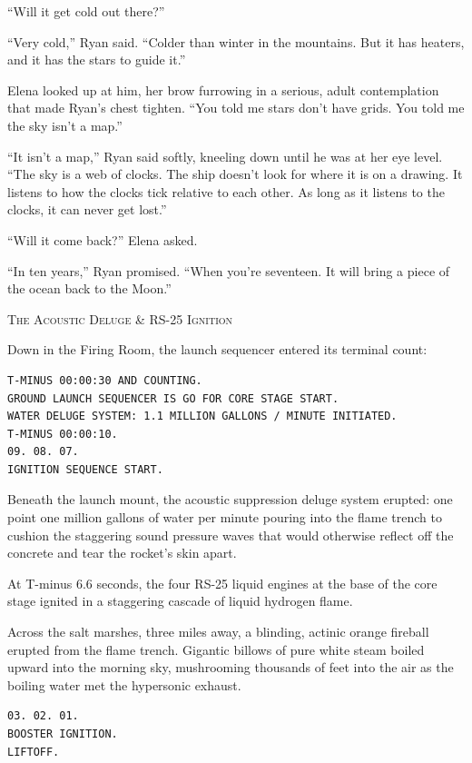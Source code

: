 \documentclass[12pt,twoside,openright]{book}
\newcommand{\sceneheader}[1]{%
  \par\vspace{1.8em}%
  {\noindent\centering\scshape\large #1\par}%
  \vspace{1.0em}%
  \noindent%
}
\newcommand{\dinkus}{%
  \par\vspace{1.2em}%
  {\noindent\centering{\large $\ast\quad\ast\quad\ast$}\par}%
  \vspace{1.2em}%
  \noindent%
}
\begin{document}
``Will it get cold out there?''

``Very cold,'' Ryan said. ``Colder than winter in the mountains. But it
has heaters, and it has the stars to guide it.''

Elena looked up at him, her brow furrowing in a serious, adult
contemplation that made Ryan's chest tighten. ``You told me stars don't
have grids. You told me the sky isn't a map.''

``It isn't a map,'' Ryan said softly, kneeling down until he was at her
eye level. ``The sky is a web of clocks. The ship doesn't look for where
it is on a drawing. It listens to how the clocks tick relative to each
other. As long as it listens to the clocks, it can never get lost.''

``Will it come back?'' Elena asked.

``In ten years,'' Ryan promised. ``When you're seventeen. It will bring
a piece of the ocean back to the Moon.''

\dinkus

\sceneheader{The Acoustic Deluge \& RS-25
Ignition}

Down in the Firing Room, the launch sequencer entered its terminal
count:

\begin{lstlisting}
T-MINUS 00:00:30 AND COUNTING.
GROUND LAUNCH SEQUENCER IS GO FOR CORE STAGE START.
WATER DELUGE SYSTEM: 1.1 MILLION GALLONS / MINUTE INITIATED.
T-MINUS 00:00:10.
09. 08. 07.
IGNITION SEQUENCE START.
\end{lstlisting}

Beneath the launch mount, the acoustic suppression deluge system
erupted: one point one million gallons of water per minute pouring into
the flame trench to cushion the staggering sound pressure waves that
would otherwise reflect off the concrete and tear the rocket's skin
apart.

At T-minus 6.6 seconds, the four RS-25 liquid engines at the base of the
core stage ignited in a staggering cascade of liquid hydrogen flame.

Across the salt marshes, three miles away, a blinding, actinic orange
fireball erupted from the flame trench. Gigantic billows of pure white
steam boiled upward into the morning sky, mushrooming thousands of feet
into the air as the boiling water met the hypersonic exhaust.

\begin{lstlisting}
03. 02. 01.
BOOSTER IGNITION.
LIFTOFF.
\end{lstlisting}
\end{document}
